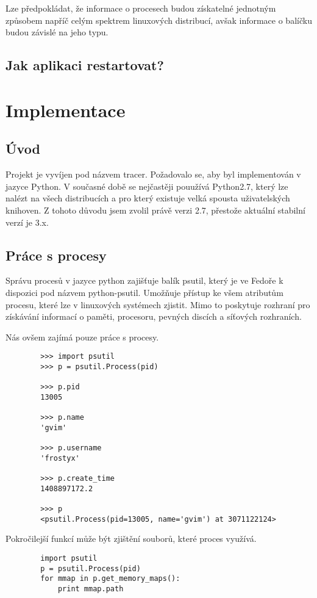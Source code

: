 \documentclass[10pt,a4paper]{article}
\begin{document}
		Lze předpokládat, že informace o procesech budou získatelné jednotným způsobem napříč celým spektrem linuxových distribucí, avšak informace o balíčku budou závislé na jeho typu.
		
		\subsection{Jak aplikaci restartovat?} 
	
	\section{Implementace}
		\subsection{Úvod}
		Projekt je vyvíjen pod názvem tracer. Požadovalo se, aby byl implementován v jazyce Python. V současné době se nejčastěji pouužívá Python2.7, který lze nalézt na všech distribucích a pro který existuje velká spousta uživatelských knihoven. Z tohoto důvodu jsem zvolil právě verzi 2.7, přestože aktuální stabilní verzí je 3.x.		
		
		\subsection{Práce s procesy}
		Správu procesů v jazyce python zajišťuje balík psutil, který je ve Fedoře k dispozici pod názvem python-psutil. Umožňuje přístup ke všem atributům procesu, které lze v linuxových systémech zjistit. Mimo to poskytuje rozhraní pro získávání informací o paměti, procesoru, pevných discích a síťových rozhraních.		

		Nás ovšem zajímá pouze práce s procesy.

		\begin{verbatim}
		>>> import psutil
		>>> p = psutil.Process(pid)

		>>> p.pid
		13005

		>>> p.name
		'gvim'

		>>> p.username
		'frostyx'

		>>> p.create_time
		1408897172.2

		>>> p
		<psutil.Process(pid=13005, name='gvim') at 3071122124>

		\end{verbatim}
		
		Pokročilejší funkcí může být zjištění souborů, které proces využívá.

		\begin{verbatim}
		import psutil
		p = psutil.Process(pid)
		for mmap in p.get_memory_maps():
		    print mmap.path
		\end{verbatim}
\end{document}
